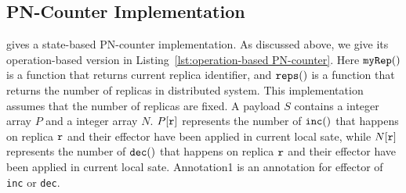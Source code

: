 




\subsection{PN-Counter Implementation}
\label{subsec:PN-counter implementation}

\cite{ShapiroPBZ11} gives a state-based PN-counter implementation. As discussed above, we give its operation-based version in Listing~\ref{lst:operation-based PN-counter}. Here $\alabelshort[{\tt myRep}]{}$ is a function that returns current replica identifier, and $\alabelshort[{\tt reps}]{}$ is a function that returns the number of replicas in distributed system. This implementation assumes that the number of replicas are fixed. A payload $S$ contains a integer array $P$ and a integer array $N$. $P[\arep]$ represents the number of $\alabelshort[{\tt inc}]{}$ that happens on replica $\arep$ and their effector have been applied in current local sate, while $N[\arep]$ represents the number of $\alabelshort[{\tt dec}]{}$ that happens on replica $\arep$ and their effector have been applied in current local sate. Annotation1 is an annotation for effector of {\tt inc} or {\tt dec}.


